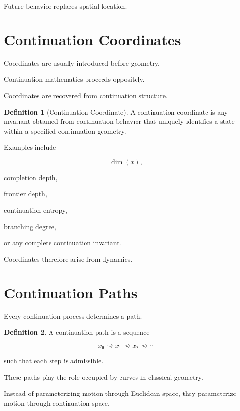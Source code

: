 \documentclass[13pt,openany]{book}
\theoremstyle{plain}
\theoremstyle{definition}
\newtheorem{definition}{Definition}[chapter]
\begin{document}
Future behavior replaces spatial location.


\section{Continuation Coordinates}

Coordinates are usually introduced before geometry.

Continuation mathematics proceeds oppositely.

Coordinates are recovered from continuation structure.

\begin{definition}[Continuation Coordinate]
A continuation coordinate is any invariant obtained from continuation behavior that uniquely identifies a state within a specified continuation geometry.
\end{definition}

Examples include

\[
\dim(x),
\]

completion depth,

frontier depth,

continuation entropy,

branching degree,

or any complete continuation invariant.

Coordinates therefore arise from dynamics.


\section{Continuation Paths}

Every continuation process determines a path.

\begin{definition}
A continuation path is a sequence

\[
x_0
\rightsquigarrow
x_1
\rightsquigarrow
x_2
\rightsquigarrow
\cdots
\]

such that each step is admissible.
\end{definition}

These paths play the role occupied by curves in classical geometry.

Instead of parameterizing motion through Euclidean space, they parameterize motion through continuation space.
\end{document}
